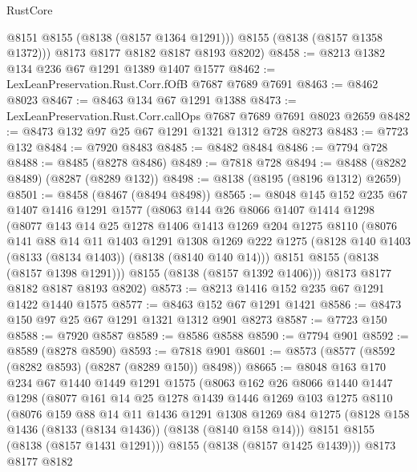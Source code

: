 \begin{lexlean}{RustCore}
\begin{coremodule}
          @8151
          @8155
          (@8138 (@8157 @1364 @1291)))
        @8155
        (@8138 (@8157 @1358 @1372)))
      @8173
      @8177
      @8182
      @8187
      @8193
      @8202)
@8458 := @8213 @1382 @134 @236 @67 @1291 @1389 @1407 @1577
@8462 := LexLeanPreservation.Rust.Corr.fOfB @7687 @7689 @7691
@8463 := @8462 @8023
@8467 := @8463 @134 @67 @1291 @1388
@8473 := LexLeanPreservation.Rust.Corr.callOps @7687 @7689 @7691 @8023 @2659
@8482 := @8473 @132 @97 @25 @67 @1291 @1321 @1312 @728 @8273
@8483 := @7723 @132
@8484 := @7920 @8483
@8485 := @8482 @8484
@8486 := @7794 @728
@8488 := @8485 (@8278 @8486)
@8489 := @7818 @728
@8494 := @8488 (@8282 @8489) (@8287 (@8289 @132))
@8498 := @8138 (@8195 (@8196 @1312) @2659)
@8501 := @8458 (@8467 (@8494 @8498))
@8565 := @8048
    @145
    @152
    @235
    @67
    @1407
    @1416
    @1291
    @1577
    (@8063
      @144
      @26
      @8066
      @1407
      @1414
      @1298
      (@8077
        @143
        @14
        @25
        @1278
        @1406
        @1413
        @1269
        @204
        @1275
        @8110
        (@8076
          @141
          @88
          @14
          @11
          @1403
          @1291
          @1308
          @1269
          @222
          @1275
          (@8128 @140 @1403 (@8133 (@8134 @1403)) (@8138 (@8140 @140 @14)))
          @8151
          @8155
          (@8138 (@8157 @1398 @1291)))
        @8155
        (@8138 (@8157 @1392 @1406)))
      @8173
      @8177
      @8182
      @8187
      @8193
      @8202)
@8573 := @8213 @1416 @152 @235 @67 @1291 @1422 @1440 @1575
@8577 := @8463 @152 @67 @1291 @1421
@8586 := @8473 @150 @97 @25 @67 @1291 @1321 @1312 @901 @8273
@8587 := @7723 @150
@8588 := @7920 @8587
@8589 := @8586 @8588
@8590 := @7794 @901
@8592 := @8589 (@8278 @8590)
@8593 := @7818 @901
@8601 := @8573 (@8577 (@8592 (@8282 @8593) (@8287 (@8289 @150)) @8498))
@8665 := @8048
    @163
    @170
    @234
    @67
    @1440
    @1449
    @1291
    @1575
    (@8063
      @162
      @26
      @8066
      @1440
      @1447
      @1298
      (@8077
        @161
        @14
        @25
        @1278
        @1439
        @1446
        @1269
        @103
        @1275
        @8110
        (@8076
          @159
          @88
          @14
          @11
          @1436
          @1291
          @1308
          @1269
          @84
          @1275
          (@8128 @158 @1436 (@8133 (@8134 @1436)) (@8138 (@8140 @158 @14)))
          @8151
          @8155
          (@8138 (@8157 @1431 @1291)))
        @8155
        (@8138 (@8157 @1425 @1439)))
      @8173
      @8177
      @8182

\end{coremodule}
\end{lexlean}
